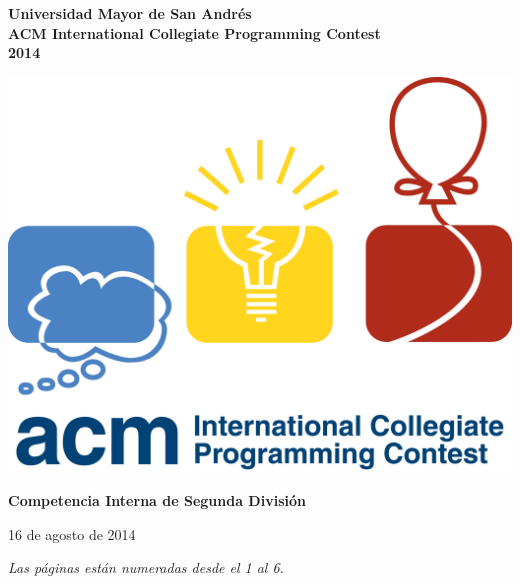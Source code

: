\pagestyle{myheadings}


\begin{titlepage}

\begin{center}

\vspace{2.5cm}
{\large \bf Universidad Mayor de San Andr\'es}\\[12pt]
{\Large \bf ACM International Collegiate Programming Contest}\\[12pt]
{\Large \bf 2014}\\[12pt]

\vspace{0.4cm}

\includegraphics[scale=0.08]{icpclogo.jpg}

\vspace{0.4cm}

{\large \bf Competencia Interna de Segunda Divisi\'on}\\[12pt]

\begin{center}
16 de agosto de 2014
\end{center}
\vspace{0.3cm}
\emph{Las p\'aginas est\'an numeradas desde el 1 al 6.}
\vspace{0.3cm}

\tableofcontents

\end{center}
\vfill
\end{titlepage}
